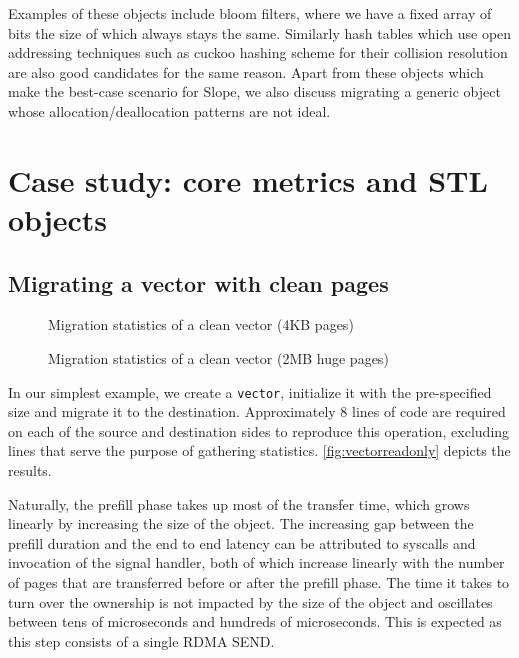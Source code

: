Examples of these objects include bloom filters, where we have a fixed
array of bits the size of which always stays the same.
Similarly hash tables which use open addressing techniques such as cuckoo
hashing scheme for their collision resolution are also good candidates for the
same reason.
Apart from these objects which make the best-case scenario for Slope, we also
discuss migrating a generic object whose allocation/deallocation patterns are not
ideal.

\section{Case study: core metrics and STL objects}
\subsection{Migrating a vector with clean pages}
\label{sec:cleanvec}

\begin{figure}[tp]
    \begin{center}
        
    \end{center}
    \caption{Migration statistics of a clean vector (4KB pages)}
    \label{fig:vectorreadonly}
\end{figure}

\begin{figure}[tp]
    \begin{center}
        
    \end{center}
    \caption{Migration statistics of a clean vector (2MB huge pages)}
    \label{fig:vectorreadonlyhp}
\end{figure}

In our simplest example, we create a \texttt{vector}, initialize it with the
pre-specified size and migrate it to the destination. Approximately $8$ lines
of code are required on each of the source and destination sides to reproduce
this operation, excluding lines that serve the purpose of gathering statistics.
\autoref{fig:vectorreadonly} depicts the results.

Naturally, the prefill phase takes up most of the transfer time, which grows
linearly by increasing the size of the object. The increasing gap between the
prefill duration and the end to end latency can be attributed to syscalls and
invocation of the signal handler, both of which increase linearly with the
number of pages that are transferred before or after the prefill phase. The
time it takes to turn over the ownership is not impacted by the
size of the object and oscillates between tens of microseconds and hundreds
of microseconds. This is expected as this step consists of a single RDMA SEND.

